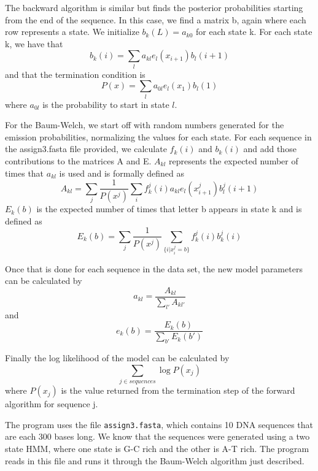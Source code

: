 \documentclass{acm_proc_article-sp}
\begin{document}
The backward algorithm is similar but finds the posterior probabilities starting from the end of the sequence.  In this case, we find a matrix b, again where each row represents a state.  We initialize $b_{k}(L) = a_{k0}$ for each state k.  For each state k, we have that
\begin{equation}b_{k}(i) = \sum_{l}a_{kl}e_{l}(x_{i+1})b_{l}(i+1)\end{equation}
and that the termination condition is
\begin{equation}P(x) = \sum_{l}a_{0l}e_{l}(x_{1})b_{l}(1)\end{equation}
where $a_{0l}$ is the probability to start in state $l$.

For the Baum-Welch, we start off with random numbers generated for the emission probabilities, normalizing the values for each state.  For each sequence in the assign3.fasta file provided, we calculate $f_{k}(i)$ and $b_{k}(i)$ and add those contributions to the matrices A and E.  $A_{kl}$ represents the expected number of times that $a_{kl}$ is used and is formally defined as
\begin{equation}A_{kl} = \sum_{j} \frac{1}{P(x^{j})}\sum_{i}f_{k}^j(i)a_{kl}e_{l}(x^j_{i+1})b^j_{l}(i+1)\end{equation}
$E_{k}(b)$ is the expected number of times that letter b appears in state k and is defined as 
\begin{equation}E_{k}(b) = \sum_{j}\frac{1}{P(x^j)}\sum_{\{i|x^j_{i}=b\}}f_{k}^j(i)b_{k}^j(i) \end{equation}

Once that is done for each sequence in the data set, the new model parameters can be calculated by 
\begin{equation}a_{kl} = \frac{A_{kl}}{\sum_{l'}A_{kl'}}\end{equation}
and 
\begin{equation}e_{k}(b) = \frac{E_{k}(b)}{\sum_{b'}E_{k}(b')}\end{equation}

Finally the log likelihood of the model can be calculated by 
\begin{equation}\sum_{j\in{sequences}}\log{P(x_{j})}\end{equation}
where $P(x_{j})$ is the value returned from the termination step of the forward algorithm for sequence j.

The program uses the file \texttt{assign3.fasta}, which contains 10 DNA sequences that are each 300 bases long.  We know that the sequences were generated using a two state HMM, where one state is G-C rich and the other is A-T rich.  The program reads in this file and runs it through the Baum-Welch algorithm just described.  
\end{document}
